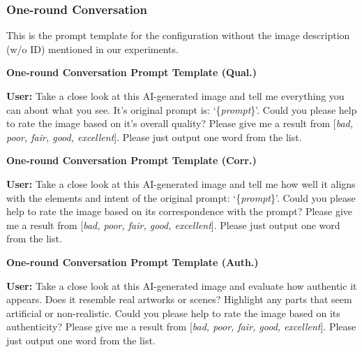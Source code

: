 \subsubsection{One-round Conversation}
This is the prompt template for the configuration without the image description (w/o ID) mentioned in our experiments.
\begin{mdframed}[linecolor=black,linewidth=0.5pt,roundcorner=10pt]
\textbf{One-round Conversation Prompt Template (Qual.)}

\textbf{User:} Take a close look at this AI-generated image and tell me everything you can about what you see. It's original prompt is: `\{\textit{prompt}\}'. Could you please help to rate the image based on it's overall quality? Please give me a result from [\textit{bad, poor, fair, good, excellent}].
Please just output one word from the list.
\end{mdframed}

\begin{mdframed}[linecolor=black,linewidth=0.5pt,roundcorner=10pt]
    \textbf{One-round Conversation Prompt Template (Corr.)}
    
    \textbf{User:} Take a close look at this AI-generated image and tell me how well it aligns with the elements and intent of the original prompt: `\{\textit{prompt}\}'. Could you please help to rate the image based on its correspondence with the prompt? Please give me a result from [\textit{bad, poor, fair, good, excellent}].
    Please just output one word from the list.
    \end{mdframed}

\begin{mdframed}[linecolor=black,linewidth=0.5pt,roundcorner=10pt]
    \textbf{One-round Conversation Prompt Template (Auth.)}
    
    \textbf{User:} Take a close look at this AI-generated image and evaluate how authentic it appears. Does it resemble real artworks or scenes? Highlight any parts that seem artificial or non-realistic. Could you please help to rate the image based on its authenticity? Please give me a result from [\textit{bad, poor, fair, good, excellent}].
    Please just output one word from the list.
    \end{mdframed}

